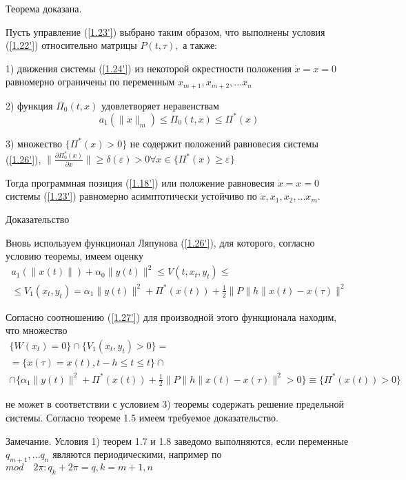 Теорема доказана.

\begin{theorem}\label{t-1.11}
Пусть управление (\ref{1.23'}) выбрано таким образом, что выполнены условия (\ref{1.22'}) относительно матрицы $P(t, \tau),$ а также: 

1) движения системы (\ref{1.24'}) из некоторой окрестности положения $\dot x = x = 0$ равномерно ограничены по переменным $x_{m+1}, x_{m+2},... x_n$

2) функция $\Pi_0 (t, x)$ удовлетворяет неравенствам $$a_1 (\| x \| _m) \le \Pi_0 (t, x) \le \Pi^{*} (x)$$

3) множество $\lbrace \Pi^{*} (x) > 0 \rbrace$ не содержит положений равновесия системы (\ref{1.26'}), $\| \frac{\partial \Pi_0^{*} (\dot x)}{\partial x} \| \ge \delta(\varepsilon) > 0 \forall x \in \lbrace \Pi^{*} (x) \ge \varepsilon \rbrace$

Тогда программная позиция (\ref{1.18'}) или положение равновесия $\dot x = x = 0$ системы (\ref{1.23'}) равномерно асимптотически устойчиво по $\dot x, x_1, x_2, ... x_m.$
\end{theorem}

Доказательство

Вновь используем функционал Ляпунова (\ref{1.26'}), для которого, согласно условию теоремы, имеем оценку 
$$
\begin{array}{c}
a_1 (\| x(t) \|) + \alpha_0 \| y(t) \|^2 \le V(t, x_t, y_t) \le\\
\le V_1 (x_t, y_t) = \alpha_1 \|y(t)\|^2 + \Pi^{*} (x(t)) + \frac12 \| P \| h \| x(t) - x(\tau) \|^2
\end{array}
$$

Согласно соотношению (\ref{1.27'}) для производной этого функционала находим, что множество
$$
\begin{array}{c}
\lbrace W (x_t) = 0 \rbrace \cap \lbrace V_1(x_t, y_t) > 0 \rbrace =\\
= \lbrace x(\tau) = x(t), t-h \le t \le t \rbrace \cap\\
\cap \{ \alpha_1 \| y(t) \|^2 + \Pi^{*} (x(t)) + \frac12 \| P\| h \| x(t) - x(\tau) \|^2 > 0 \rbrace \equiv \lbrace \Pi^{*} (x(t)) > 0 \}
\end{array}
$$

не может в соответствии с условием 3) теоремы содержать решение предельной системы. Согласно теореме 1.5 имеем требуемое доказательство.

Замечание. Условия 1) теорем 1.7 и 1.8 заведомо выполняются, если переменные $q_{m+1}, ... q_n$ являются периодическими, например по $mod \quad 2 \pi: q_k + 2 \pi = q, k = m + 1, n$